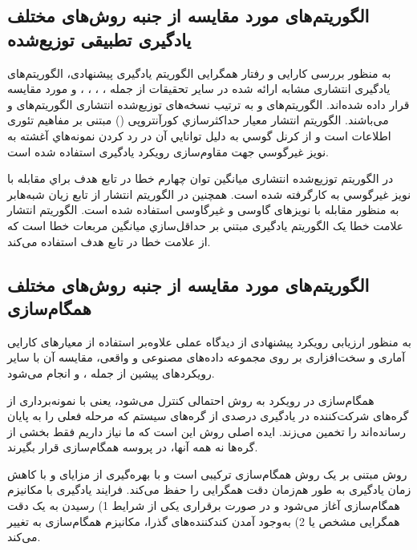 \subsection{الگوریتم‌های مورد مقایسه از جنبه روش‌های مختلف یادگیری تطبیقی توزیع‌شده }
به منظور بررسی کارایی و رفتار همگرایی الگوریتم یادگیری پیشنهادی، الگوریتم‌های یادگیری انتشاری مشابه ارائه شده در سایر تحقیقات از جمله  ، ، ، ،  و  مورد مقایسه قرار داده شده‌اند. الگوریتم‌های   \cite{Cat20082} و   \cite{Lop2008} به ترتیب نسخه‌های توزیع‌شده انتشاری الگوریتم‌های  و  می‌باشند. الگوریتم انتشار معيار حداكثرسازي کورآنتروپی () \cite{MA2016} مبتنی بر مفاهیم تئوری اطلاعات است و از كرنل گوسي به دليل توانايي آن در رد كردن نمونه‌هاي آغشته به نويز غيرگوسي جهت مقاوم‌سازی رویکرد یادگیری استفاده شده است.

در الگوريتم توزیع‌شده انتشاری   \cite{Park2014} ميانگين توان چهارم خطا در تابع هدف براي مقابله با نويز غيرگوسي به كارگرفته شده است. همچنين در الگوريتم انتشار  \cite{Ashk} از تابع زيان شبه‌هابر به منظور مقابله با نویزهای گاوسی و غیرگاوسی استفاده شده است. الگوريتم انتشار علامت خطا  \cite{Ni2016}  یک الگوریتم یادگیری مبتني بر حداقل‌سازي ميانگين مربعات خطا است که از علامت خطا در تابع هدف استفاده می‌کند. 


\subsection{الگوریتم‌های مورد مقایسه از جنبه روش‌های مختلف همگام‌سازی}
به منظور ارزیابی رویکرد پیشنهادی از دیدگاه عملی علاوه‌بر استفاده از معیارهای کارایی آماری و سخت‌افزاری بر روی مجموعه داده‌های مصنوعی و واقعی، مقایسه آن با سایر رویکردهای پیشین از جمله  ،  و  انجام می‌شود. 

همگام‌سازی در رویکرد  \cite{Zhao2021} به روش احتمالی کنترل می‌شود، یعنی با نمونه‌برداری از گره‌های شرکت‌کننده در یادگیری درصدی از گره‌های سیستم که مرحله فعلی را به پایان رسانده‌اند را تخمین می‌زند. ایده اصلی روش  این است که ما نیاز داریم فقط بخشی از گره‌ها نه همه آنها، در پروسه همگام‌سازی قرار بگیرند.  

روش   \cite{Syncswitch2021} مبتنی بر یک روش همگام‌سازی ترکیبی است و با بهره‌گیری از مزایای  و  با کاهش زمان یادگیری به طور هم‌زمان دقت همگرایی را حفظ می‌کند. فرایند یادگیری با مکانیزم همگام‌سازی  آغاز می‌شود و در صورت برقراری یکی از شرایط 1) رسیدن به یک دقت همگرایی مشخص یا 2) به‌وجود آمدن کند‌کننده‌های گذرا،  مکانیزم همگام‌سازی به  تغییر می‌کند. 

